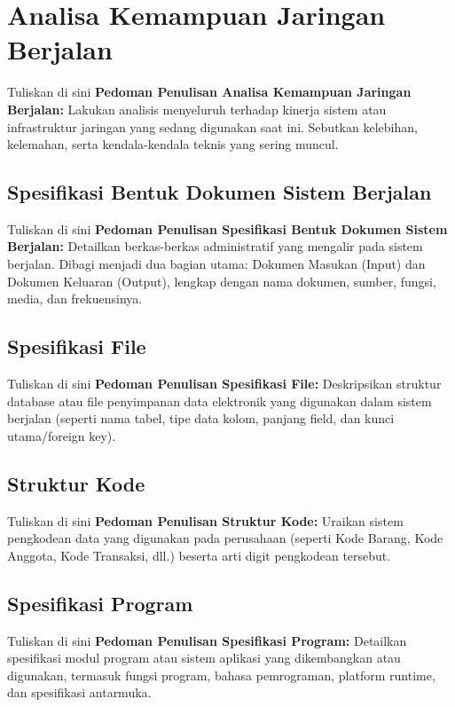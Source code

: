 \section{Analisa Kemampuan Jaringan Berjalan}


Tuliskan di sini \textbf{Pedoman Penulisan Analisa Kemampuan Jaringan Berjalan:} Lakukan analisis menyeluruh terhadap kinerja sistem atau infrastruktur jaringan yang sedang digunakan saat ini. Sebutkan kelebihan, kelemahan, serta kendala-kendala teknis yang sering muncul.


\subsection{Spesifikasi Bentuk Dokumen Sistem Berjalan}


Tuliskan di sini \textbf{Pedoman Penulisan Spesifikasi Bentuk Dokumen Sistem Berjalan:} Detailkan berkas-berkas administratif yang mengalir pada sistem berjalan. Dibagi menjadi dua bagian utama: Dokumen Masukan (Input) dan Dokumen Keluaran (Output), lengkap dengan nama dokumen, sumber, fungsi, media, dan frekuensinya.


\subsection{Spesifikasi File}


Tuliskan di sini \textbf{Pedoman Penulisan Spesifikasi File:} Deskripsikan struktur database atau file penyimpanan data elektronik yang digunakan dalam sistem berjalan (seperti nama tabel, tipe data kolom, panjang field, dan kunci utama/foreign key).


\subsection{Struktur Kode}


Tuliskan di sini \textbf{Pedoman Penulisan Struktur Kode:} Uraikan sistem pengkodean data yang digunakan pada perusahaan (seperti Kode Barang, Kode Anggota, Kode Transaksi, dll.) beserta arti digit pengkodean tersebut.


\subsection{Spesifikasi Program}


Tuliskan di sini \textbf{Pedoman Penulisan Spesifikasi Program:} Detailkan spesifikasi modul program atau sistem aplikasi yang dikembangkan atau digunakan, termasuk fungsi program, bahasa pemrograman, platform runtime, dan spesifikasi antarmuka.

